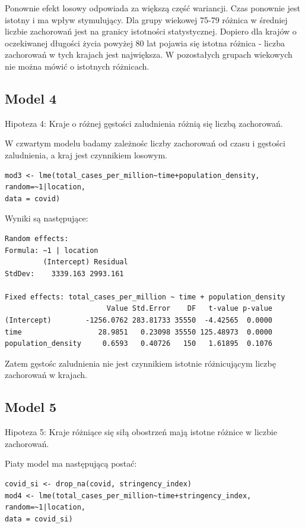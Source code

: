 \documentclass[12pt]{mwbk}
\theoremstyle{plain}
\theoremstyle{definition}
\theoremstyle{remark}
\begin{document}
Ponownie efekt losowy odpowiada za większą część wariancji. Czas ponownie jest istotny i ma wpływ stymulujący. Dla grupy wiekowej 75-79 różnica w średniej liczbie zachorowań jest na granicy istotności statystycznej. Dopiero dla krajów o oczekiwanej długości życia powyżej 80 lat pojawia się istotna różnica - liczba zachorowań w tych krajach jest największa. W pozostałych grupach wiekowych nie można mówić o istotnych różnicach. 
\subsection{Model 4}

Hipoteza 4: Kraje o różnej gęstości zaludnienia różnią się liczbą zachorowań.

W czwartym modelu badamy zależnośc liczby zachorowań od czasu i gęstości zaludnienia, a kraj jest czynnikiem losowym.

\begin{verbatim}
mod3 <- lme(total_cases_per_million~time+population_density,
random=~1|location,
data = covid)
\end{verbatim}

Wyniki są następujące:

\begin{verbatim}
Random effects:
Formula: ~1 | location
         (Intercept) Residual
StdDev:    3339.163 2993.161

Fixed effects: total_cases_per_million ~ time + population_density 
                        Value Std.Error    DF   t-value p-value
(Intercept)        -1256.0762 283.81733 35550  -4.42565  0.0000
time                  28.9851   0.23098 35550 125.48973  0.0000
population_density     0.6593   0.40726   150   1.61895  0.1076
\end{verbatim}

Zatem gęstośc zaludnienia nie jest czynnikiem istotnie różnicującym liczbę zachorowań w krajach.

\subsection{Model 5}

Hipoteza 5: Kraje różniące się siłą obostrzeń mają istotne różnice w liczbie zachorowań.


Piaty model ma następującą postać:

\begin{verbatim}
covid_si <- drop_na(covid, stringency_index)
mod4 <- lme(total_cases_per_million~time+stringency_index,
random=~1|location,
data = covid_si)
\end{verbatim}
\end{document}
